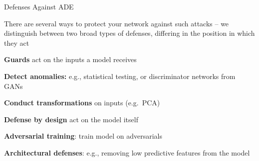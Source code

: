 \documentclass[10pt,compress,t,notes=noshow, xcolor=table]{beamer}
\begin{document}
\begin{framei}[align=top]{Defenses Against ADE}
\item There are several ways to protect your network against such attacks -- we distinguish between two broad types of defenses, differing in the position in which they act
\item \textbf{Guards} act on the inputs a model receives
\begin{itemizeS}
\item \textbf{Detect anomalies:} e.g., statistical testing, or discriminator networks from GANs
\item \textbf{Conduct transformations} on inputs (e.g.\ PCA)
\end{itemizeS}
\item \textbf{Defense by design} act on the model itself
\begin{itemizeS}
\item \textbf{Adversarial training}: train model on adversarials
\item \textbf{Architectural defenses}: e.g., removing low predictive features from the model
\end{itemizeS}
\end{framei}

\end{document}
